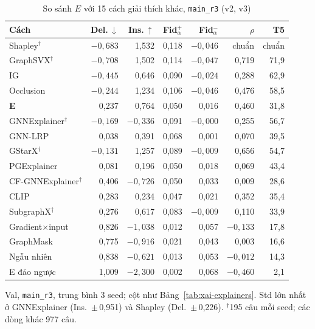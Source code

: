 \begin{table}[t]
  \caption{So sánh $E$ với 15 cách giải thích khác, \texttt{main\_r3} (v2, v3)}
  \label{tab:xai-explainers-mainr3}
  \centering
  \footnotesize
  \setlength{\tabcolsep}{3pt}
  \begin{tabular}{@{}lrrrrrr@{}}
    \toprule
    Cách & Del.\,$\downarrow$ & Ins.\,$\uparrow$ & Fid$_{\alpha}^{+}$ & Fid$_{\alpha}^{-}$ & $\rho$ & T5 \\
    \midrule
    Shapley$^{\dagger}$ & $-0{,}683$ & 1,532 & 0,118 & $-0{,}046$ & chuẩn & chuẩn \\
    GraphSVX$^{\dagger}$ & $-0{,}708$ & 1,502 & 0,114 & $-0{,}047$ & 0,719 & 71,9 \\
    IG & $-0{,}445$ & 0,646 & 0,090 & $-0{,}024$ & 0,288 & 62,9 \\
    Occlusion & $-0{,}244$ & 1,234 & 0,106 & $-0{,}046$ & 0,476 & 58,5 \\
    \textbf{E} & 0,237 & 0,764 & 0,050 & 0,016 & 0,460 & 31,8 \\
    GNNExplainer$^{\dagger}$ & $-0{,}169$ & $-0{,}336$ & 0,091 & $-0{,}000$ & 0,255 & 56,7 \\
    GNN-LRP & 0,038 & 0,391 & 0,068 & 0,001 & 0,070 & 39,5 \\
    GStarX$^{\dagger}$ & $-0{,}131$ & 1,257 & 0,089 & $-0{,}009$ & 0,656 & 54,7 \\
    PGExplainer & 0,081 & 0,196 & 0,050 & 0,018 & 0,069 & 43,4 \\
    CF-GNNExplainer$^{\dagger}$ & 0,406 & $-0{,}726$ & 0,050 & 0,033 & 0,009 & 28,6 \\
    CLIP & 0,283 & 0,234 & 0,047 & 0,021 & 0,352 & 35,4 \\
    SubgraphX$^{\dagger}$ & 0,276 & 0,617 & 0,083 & $-0{,}009$ & 0,110 & 33,9 \\
    Gradient$\times$input & 0,826 & $-1{,}038$ & 0,012 & 0,057 & $-0{,}133$ & 17,8 \\
    GraphMask & 0,775 & $-0{,}916$ & 0,021 & 0,043 & 0,003 & 16,6 \\
    Ngẫu nhiên & 0,838 & $-0{,}621$ & 0,013 & 0,053 & $-0{,}012$ & 14,3 \\
    E đảo ngược & 1,009 & $-2{,}300$ & 0,002 & 0,068 & $-0{,}460$ & 2,1 \\
    \bottomrule
  \end{tabular}
  \par\smallskip
  {\scriptsize\raggedright
    Val, \texttt{main\_r3}, trung bình 3 seed; cột như Bảng~\ref{tab:xai-explainers}. Std lớn nhất ở GNNExplainer (Ins.\
    $\pm$\,0,951) và Shapley (Del.\ $\pm$\,0,226). $^{\dagger}$195 câu mỗi seed; các dòng khác 977 câu.\par}
\end{table}

